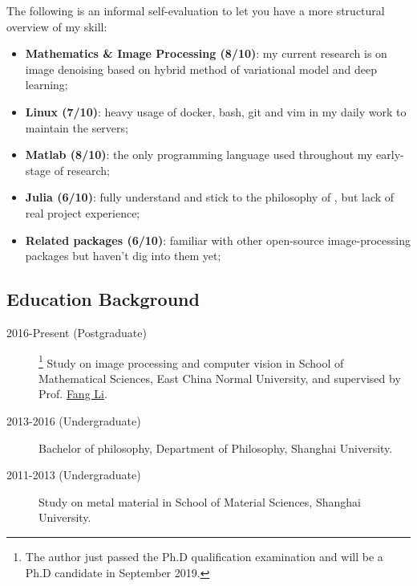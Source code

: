 The following is an informal self-evaluation to let you have a more structural overview of my skill:

\begin{itemize}
    \item \textbf{Mathematics \& Image Processing (8/10)}: my current research is on image denoising based on hybrid method of variational model and deep learning;
    \item \textbf{Linux (7/10)}: heavy usage of docker, bash, git and vim in my daily work to maintain the servers;
    \item \textbf{Matlab (8/10)}: the only programming language used throughout my early-stage of research;
    \item \textbf{Julia (6/10)}: fully understand and stick to the philosophy of \langjulia, but lack of real project experience;
    \item \textbf{Related packages (6/10)}: familiar with other open-source image-processing packages but haven't dig into them yet;
\end{itemize}

\subsection{Education Background}

\begin{description}
    \item[2016-Present (Postgraduate)]\footnote{The author just passed the Ph.D qualification examination and will be a Ph.D candidate in September 2019.} Study on image processing and computer vision in School of Mathematical Sciences, East China Normal University, and supervised by Prof. \href{http://math.ecnu.edu.cn/~fli/}{\textsf{Fang Li}}.
    \item[2013-2016 (Undergraduate)] Bachelor of philosophy, Department of Philosophy, Shanghai University.
    \item[2011-2013 (Undergraduate)] Study on metal material in School of Material Sciences, Shanghai University.
\end{description}
